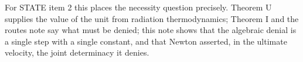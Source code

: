 \documentclass[11pt,a4paper]{article}
\begin{document}
For STATE item 2 this places the necessity question precisely. Theorem U
supplies the value of the unit from radiation thermodynamics; Theorem I
and the routes note say what must be denied; this note shows that the
algebraic denial is a single step with a single constant, and that
Newton asserted, in the ultimate velocity, the joint determinacy it
denies.
\end{document}
